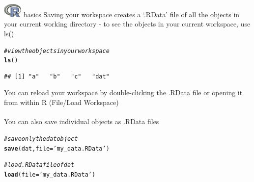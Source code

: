 \documentclass[xcolor=svgnames]{beamer}\usepackage[]{graphicx}\usepackage[]{color}
\makeatletter
\newcommand{\hlstr}[1]{\textcolor[rgb]{0.192,0.494,0.8}{#1}}%
\newcommand{\hlcom}[1]{\textcolor[rgb]{0.678,0.584,0.686}{\textit{#1}}}%
\newcommand{\hlstd}[1]{\textcolor[rgb]{0.345,0.345,0.345}{#1}}%
\newcommand{\hlkwc}[1]{\textcolor[rgb]{0.333,0.667,0.333}{#1}}%
\newcommand{\hlkwd}[1]{\textcolor[rgb]{0.737,0.353,0.396}{\textbf{#1}}}%
\newenvironment{kframe}{%
 \def\at@end@of@kframe{}%
 \ifinner\ifhmode%
  \def\at@end@of@kframe{\end{minipage}}%
  \begin{minipage}{\columnwidth}%
 \fi\fi%
 \def\FrameCommand##1{\hskip\@totalleftmargin \hskip-\fboxsep
 \colorbox{shadecolor}{##1}\hskip-\fboxsep
     \hskip-\linewidth \hskip-\@totalleftmargin \hskip\columnwidth}%
 \MakeFramed {\advance\hsize-\width
   \@totalleftmargin\z@ \linewidth\hsize
   \@setminipage}}%
 {\par\unskip\endMakeFramed%
 \at@end@of@kframe}
\newenvironment{knitrout}{}{} %
\makeatother
\begin{document}
\begin{frame}{\includegraphics[width=0.07\textwidth]{Rlogo.jpg} \hspace{0.01in} basics}
Saving your workspace creates a `.RData' file of all the objects in your current working directory - to see the objects in your current workspace, use ls()
\begin{knitrout}\scriptsize
{}\color{fgcolor}\begin{kframe}
\begin{alltt}
\hlcom{# view the objects in your workspace}
\hlkwd{ls}\hlstd{()}
\end{alltt}
\begin{verbatim}
## [1] "a"   "b"   "c"   "dat"
\end{verbatim}
\end{kframe}
\end{knitrout}
You can reload your workspace by double-clicking the .RData file or opening it from within R (File/Load Workspace)\\~\\
You can also save individual objects as .RData files
\begin{knitrout}\scriptsize
{}\color{fgcolor}\begin{kframe}
\begin{alltt}
\hlcom{# save only the dat object}
\hlkwd{save}\hlstd{(dat,} \hlkwc{file} \hlstd{=} \hlstr{'my_data.RData'}\hlstd{)}

\hlcom{# load .RData file of dat}
\hlkwd{load}\hlstd{(}\hlkwc{file} \hlstd{=} \hlstr{'my_data.RData'}\hlstd{)}
\end{alltt}
\end{kframe}
\end{knitrout}
\end{frame}
\end{document}
